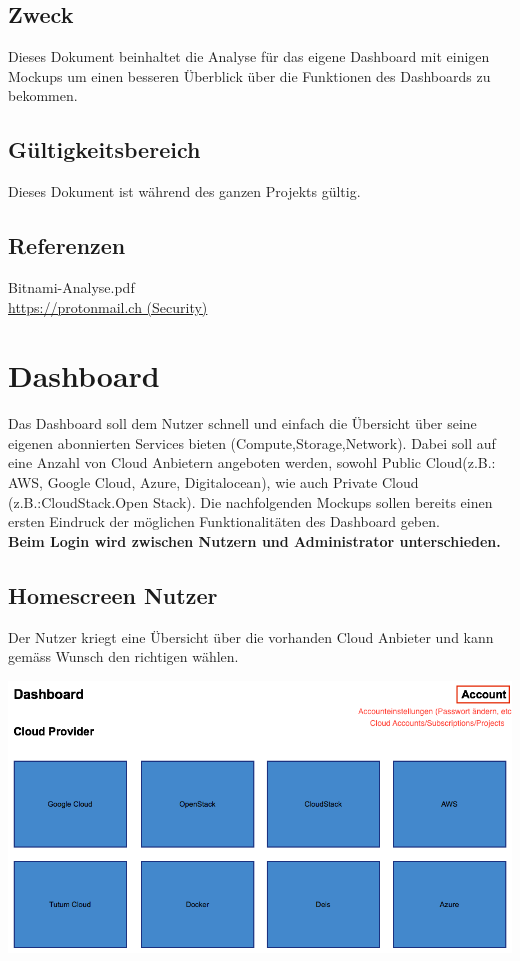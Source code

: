 \documentclass[11pt]{scrartcl}
\begin{document}
\subsection{Zweck}

Dieses Dokument beinhaltet die Analyse für das eigene Dashboard mit einigen 
Mockups um einen besseren Überblick über die Funktionen des Dashboards zu 
bekommen.

\subsection{Gültigkeitsbereich}

Dieses Dokument ist während des ganzen Projekts gültig.

\subsection{Referenzen}
Bitnami-Analyse.pdf\\
\href{https://protonmail.ch}{https://protonmail.ch (Security)} 

\section{Dashboard}
Das Dashboard soll dem Nutzer schnell und einfach die Übersicht über seine 
eigenen abonnierten Services bieten (Compute,Storage,Network).
Dabei soll auf eine Anzahl von Cloud Anbietern angeboten werden, sowohl Public 
Cloud(z.B.: AWS, Google Cloud, Azure, Digitalocean), wie auch Private Cloud (z.B.:CloudStack.Open 
Stack).
Die nachfolgenden Mockups sollen bereits einen ersten Eindruck der 
möglichen Funktionalitäten des Dashboard geben.
\\
\textbf{Beim Login wird zwischen Nutzern und Administrator unterschieden.}

\subsection{Homescreen Nutzer}
Der Nutzer kriegt eine Übersicht über die vorhanden Cloud Anbieter und kann 
gemäss Wunsch den richtigen wählen.

\includegraphics[width=\textwidth]{homescreen_user}
\end{document}
